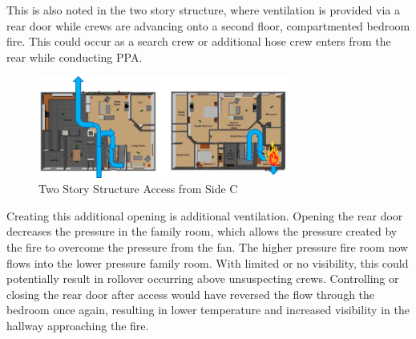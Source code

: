 \documentclass{article}
\begin{document}
This is also noted in the two story structure, where ventilation is provided via a rear door while crews are advancing onto a second floor, compartmented bedroom fire. This could occur as a search crew or additional hose crew enters from the rear while conducting PPA. 

\begin{figure} [H]
	\centering
	\includegraphics[width = 3.25in]{0_Images/Tactical_Considerations/Additional_Vent/TwoStoryKitchenVent.png}
	\caption{Two Story Structure Access from Side C}
	\label{fig:AdditionalVents_TwoStoryConfig}
\end{figure}

Creating this additional opening is additional ventilation. Opening the rear door decreases the pressure in the family room, which allows the pressure created by the fire to overcome the pressure from the fan. The higher pressure fire room now flows into the lower pressure family room. With limited or no visibility, this could potentially result in rollover occurring above unsuspecting crews. Controlling or closing the rear door after access would have reversed the flow through the bedroom once again, resulting in lower temperature and increased visibility in the hallway approaching the fire. 
\end{document}
